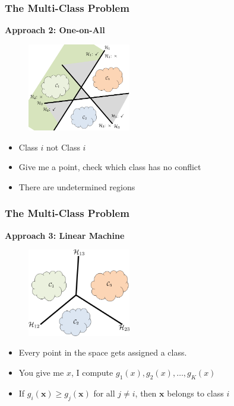 \documentclass[8pt,dvipsnames]{beamer}
\begin{document}
\begin{frame}
	\frametitle{The Multi-Class Problem}
	\textbf{Approach 2: One-on-All}
	\begin{figure}[htbp]
		\centering
		\includegraphics[width=0.4\textwidth]{imgs/adv_overview_12.png}
	\end{figure}
	\begin{itemize}
		\item Class $i$ not Class $i$
		\item Give me a point, check which class has no conflict
		\item There are undetermined regions
	\end{itemize}
\end{frame}

\begin{frame}
	\frametitle{The Multi-Class Problem}
	\textbf{Approach 3: Linear Machine}
		\begin{figure}[htbp]
		\centering
		\includegraphics[width=0.4\textwidth]{imgs/adv_overview_13.png}
	\end{figure}
	\begin{itemize}
		\item Every point in the space gets assigned a class. 
		\item You give me \(x\), I compute \(g_{1}(x), g_{2}(x), \ldots, g_{K}(x)\)
		\item If \(g_{i}(\boldsymbol{x}) \geq g_{j}(\boldsymbol{x})\) for all \(j \neq i\), then \(\boldsymbol{x}\) belongs to class \(i\)
	\end{itemize}
\end{frame}
\end{document}
